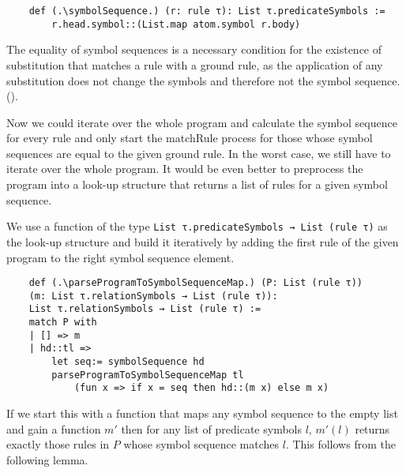 \begin{lstlisting}
    def (.\symbolSequence.) (r: rule τ): List τ.predicateSymbols := 
        r.head.symbol::(List.map atom.symbol r.body)

\end{lstlisting}

The equality of symbol sequences is a necessary condition for the existence of substitution that matches a rule with a ground rule, as the application of any substitution does not change the symbols and therefore not the symbol sequence. (\symbolSequenceNotEq).

Now we could iterate over the whole program and calculate the symbol sequence for every rule and only start the matchRule process for those whose symbol sequences are equal to the given ground rule. In the worst case, we still have to iterate over the whole program. It would be even better to preprocess the program into a look-up structure that returns a list of rules for a given symbol sequence.

We use a function of the type \lstinline|List τ.predicateSymbols → List (rule τ)| as the look-up structure and build it iteratively by adding the first rule of the given program to the right symbol sequence element.

\begin{lstlisting}
    def (.\parseProgramToSymbolSequenceMap.) (P: List (rule τ)) 
    (m: List τ.relationSymbols → List (rule τ)): 
    List τ.relationSymbols → List (rule τ) :=
    match P with
    | [] => m
    | hd::tl =>
        let seq:= symbolSequence hd
        parseProgramToSymbolSequenceMap tl 
            (fun x => if x = seq then hd::(m x) else m x)
\end{lstlisting}

If we start this with a function that maps any symbol sequence to the empty list and gain a function $m'$ then for any list of predicate symbols $l$, $m'(l)$ returns exactly those rules in $P$ whose symbol sequence matches $l$. This follows from the following lemma.

